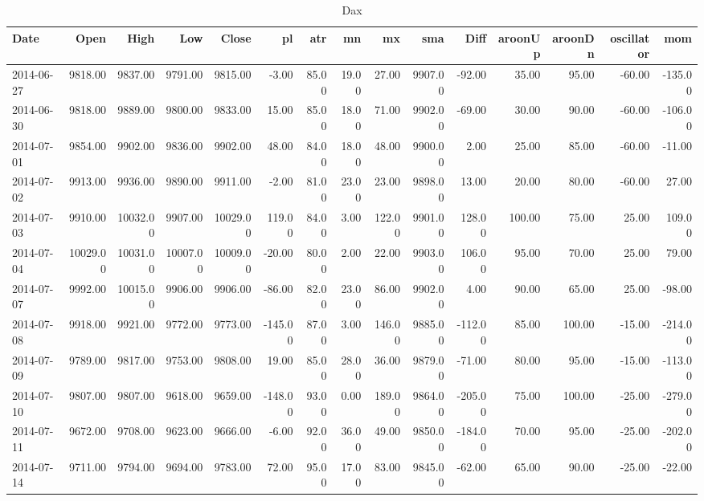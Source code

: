 \documentclass{article}
\begin{document}
\begin{table}[ht]
\centering
\caption{Dax} 
\begin{tabular}{lrrrrrrrrrrrrrr}
  \hline
Date & Open & High & Low & Close & pl & atr & mn & mx & sma & Diff & aroonUp & aroonDn & oscillator & mom \\ 
  \hline
2014-06-27 & 9818.00 & 9837.00 & 9791.00 & 9815.00 & -3.00 & 85.00 & 19.00 & 27.00 & 9907.00 & -92.00 & 35.00 & 95.00 & -60.00 & -135.00 \\ 
  2014-06-30 & 9818.00 & 9889.00 & 9800.00 & 9833.00 & 15.00 & 85.00 & 18.00 & 71.00 & 9902.00 & -69.00 & 30.00 & 90.00 & -60.00 & -106.00 \\ 
  2014-07-01 & 9854.00 & 9902.00 & 9836.00 & 9902.00 & 48.00 & 84.00 & 18.00 & 48.00 & 9900.00 & 2.00 & 25.00 & 85.00 & -60.00 & -11.00 \\ 
  2014-07-02 & 9913.00 & 9936.00 & 9890.00 & 9911.00 & -2.00 & 81.00 & 23.00 & 23.00 & 9898.00 & 13.00 & 20.00 & 80.00 & -60.00 & 27.00 \\ 
  2014-07-03 & 9910.00 & 10032.00 & 9907.00 & 10029.00 & 119.00 & 84.00 & 3.00 & 122.00 & 9901.00 & 128.00 & 100.00 & 75.00 & 25.00 & 109.00 \\ 
  2014-07-04 & 10029.00 & 10031.00 & 10007.00 & 10009.00 & -20.00 & 80.00 & 2.00 & 22.00 & 9903.00 & 106.00 & 95.00 & 70.00 & 25.00 & 79.00 \\ 
  2014-07-07 & 9992.00 & 10015.00 & 9906.00 & 9906.00 & -86.00 & 82.00 & 23.00 & 86.00 & 9902.00 & 4.00 & 90.00 & 65.00 & 25.00 & -98.00 \\ 
  2014-07-08 & 9918.00 & 9921.00 & 9772.00 & 9773.00 & -145.00 & 87.00 & 3.00 & 146.00 & 9885.00 & -112.00 & 85.00 & 100.00 & -15.00 & -214.00 \\ 
  2014-07-09 & 9789.00 & 9817.00 & 9753.00 & 9808.00 & 19.00 & 85.00 & 28.00 & 36.00 & 9879.00 & -71.00 & 80.00 & 95.00 & -15.00 & -113.00 \\ 
  2014-07-10 & 9807.00 & 9807.00 & 9618.00 & 9659.00 & -148.00 & 93.00 & 0.00 & 189.00 & 9864.00 & -205.00 & 75.00 & 100.00 & -25.00 & -279.00 \\ 
  2014-07-11 & 9672.00 & 9708.00 & 9623.00 & 9666.00 & -6.00 & 92.00 & 36.00 & 49.00 & 9850.00 & -184.00 & 70.00 & 95.00 & -25.00 & -202.00 \\ 
  2014-07-14 & 9711.00 & 9794.00 & 9694.00 & 9783.00 & 72.00 & 95.00 & 17.00 & 83.00 & 9845.00 & -62.00 & 65.00 & 90.00 & -25.00 & -22.00 \\ 

\end{tabular}
\end{table}
\end{document}
